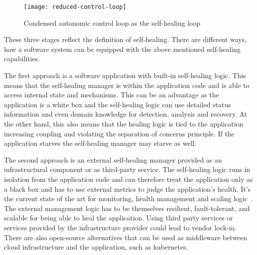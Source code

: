   \begin{figure}
    \centering
    \texttt{[image: reduced-control-loop]}
    \caption{Condensed autonomic control loop as the self-healing loop}
    \label{fig:self-healing-loop}
  \end{figure}

  These three stages reflect the definition of self-healing.
  There are different ways, how a software system can be equipped with the above mentioned self-healing capabilities.

  The first approach is a software application with built-in self-healing logic.
  This means that the self-healing manager is within the application code and is able to access internal state and mechanisms.
  This can be an advantage as the application is a white box and the self-healing logic can use detailed status information and even domain knowledge for detection, analysis and recovery.
  At the other hand, this also means that the healing logic is tied to the application increasing coupling and violating the separation of concerns principle.
  If the application starves the self-healing manager may starve as well.

  The second approach is an external self-healing manager provided as an infrastructural component or as third-party service.
  The self-healing logic runs in isolation from the application code and can therefore treat the application only as a black box and has to use external metrics to judge the application's health.
  It's the current state of the art for monitoring, health management and scaling logic~\cite{ToffettiMicroservices}.
  The external management logic has to be themselves resilient, fault-tolerant, and scalable for being able to heal the application.
  Using third party services or services provided by the infrastructure provider could lead to vendor lock-in.
  There are also open-source alternatives that can be used as middleware between cloud infrastructure and the application, such as \gls{kubernetes}.

